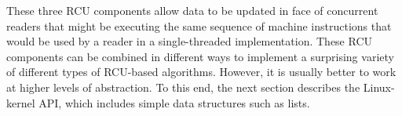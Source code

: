 \QuickQuizEnd

These three RCU components allow data to be updated in face of concurrent
readers that might be executing the same sequence of machine instructions
that would be used by a reader in a single-threaded implementation.
These RCU components can be combined in different ways to implement a
surprising variety of different types of RCU-based algorithms.
However, it is usually better to work at higher levels of abstraction.
To this end, the next section describes the Linux-kernel API, which
includes simple data structures such as lists.

